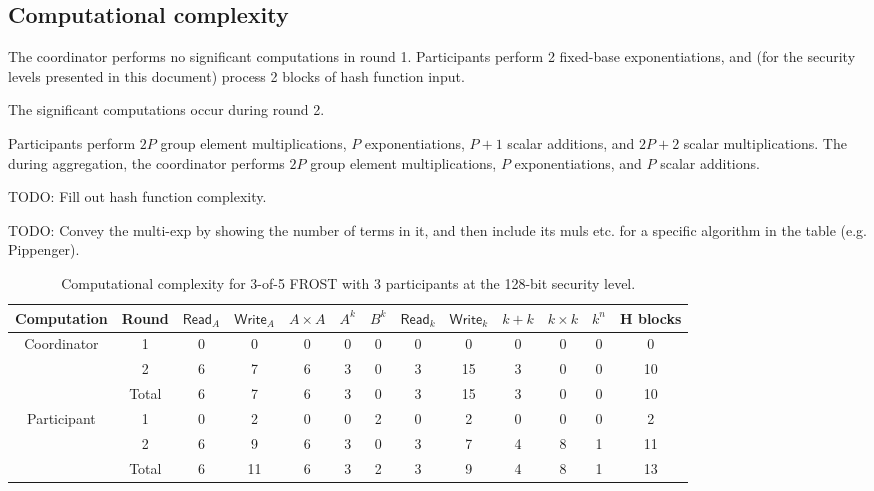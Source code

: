 \subsection{Computational complexity}

The coordinator performs no significant computations in round 1. Participants
perform 2 fixed-base exponentiations, and (for the security levels presented in
this document) process 2 blocks of hash function input.

The significant computations occur during round 2.

Participants perform $2P$ group element multiplications, $P$ exponentiations,
$P + 1$ scalar additions, and $2P + 2$ scalar multiplications. The during
aggregation, the coordinator performs $2P$ group element multiplications, $P$
exponentiations, and $P$ scalar additions.

TODO: Fill out hash function complexity.

TODO: Convey the multi-exp by showing the number of terms in it, and then include
its muls etc. for a specific algorithm in the table (e.g. Pippenger).

\begin{table}
	\centering
	\begin{tabular}{c c c c c c c c c c c c c}
		\toprule
		Computation & Round & $\mathsf{Read}_A$ & $\mathsf{Write}_A$ & $A \times A$ & $A^k$  & $B^k$  & $\mathsf{Read}_k$ & $\mathsf{Write}_k$ & $k + k$ & $k \times k$ & $k^n$ & H blocks \\ \midrule
		Coordinator & 1 & 0 & 0 & 0 & 0 & 0 & 0 & 0 & 0 & 0 & 0 & 0 \\
		            & 2 & 6 & 7 & 6 & 3 & 0 & 3 & 15 & 3 & 0 & 0 & 10 \\
		            & Total & 6 & 7 & 6 & 3 & 0 & 3 & 15 & 3 & 0 & 0 & 10 \\
		\midrule
		Participant & 1 & 0 & 2 & 0 & 0 & 2 & 0 & 2 & 0 & 0 & 0 & 2 \\
		            & 2 & 6 & 9 & 6 & 3 & 0 & 3 & 7 & 4 & 8 & 1 & 11 \\
		            & Total & 6 & 11 & 6 & 3 & 2 & 3 & 9 & 4 & 8 & 1 & 13 \\
		\bottomrule
	\end{tabular}
	\caption{Computational complexity for 3-of-5 FROST with 3 participants at the 128-bit security level.}
\end{table}

